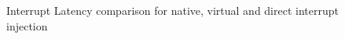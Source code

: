 \begin{figure}[!htb]
\begin{center}
\end{center}
\ifreport
\caption{Interrupt Latency comparison for native, virtual and direct interrupt injection}
\label{plot-dii}
\else
\label{plot-dii2}
\fi
\end{figure}
